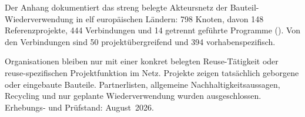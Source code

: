 \label{anlage:akteursnetz}

Der Anhang dokumentiert das streng belegte Akteursnetz der Bauteil-Wiederverwendung in elf europäischen Ländern: 798 Knoten, davon 148 Referenzprojekte, 444 Verbindungen und 14 getrennt geführte Programme (). Von den Verbindungen sind 50 projektübergreifend und 394 vorhabenspezifisch.

Organisationen bleiben nur mit einer konkret belegten Reuse-Tätigkeit oder reuse-spezifischen Projektfunktion im Netz. Projekte zeigen tatsächlich geborgene oder eingebaute Bauteile. Partnerlisten, allgemeine Nachhaltigkeitsaussagen, Recycling und nur geplante Wiederverwendung wurden ausgeschlossen. Erhebungs- und Prüfstand: August~2026.






